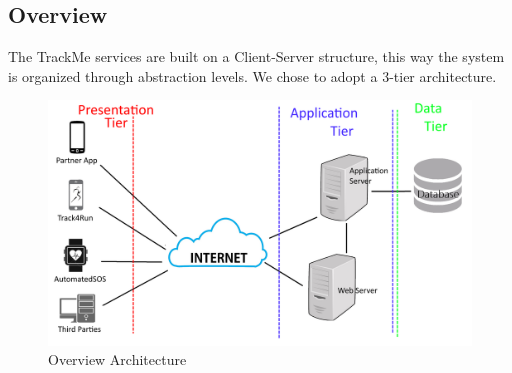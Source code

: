 \subsection{Overview}
The TrackMe services are built on a Client-Server structure, this way the system is organized through abstraction levels.
We chose to adopt a 3-tier architecture.
\\[0.2cm]
\begin{figure}[H]
\centering
\includegraphics[scale=0.18]{Images/Overview.png}
\caption{Overview Architecture }
\end{figure}

